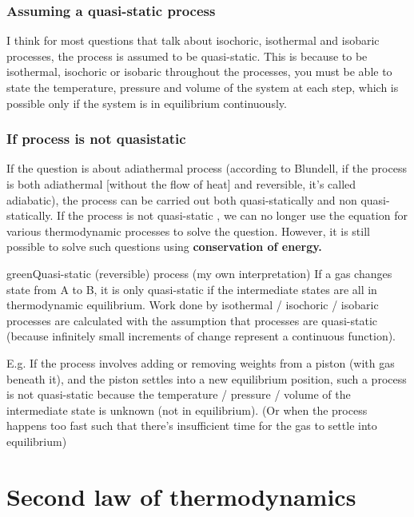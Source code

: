 \subsubsection{Assuming a quasi-static process}
I think for most questions that talk about isochoric, isothermal and isobaric processes, the process is assumed to be quasi-static. This is because to be isothermal, isochoric or isobaric throughout the processes, you must be able to state the temperature, pressure and volume of the system at each step, which is possible only if the system is in equilibrium continuously.

\subsubsection{If process is not quasistatic}

If the question is about adiathermal process (according to Blundell, if the process is both adiathermal [without the flow of heat] and reversible, it's called adiabatic), the process can be carried out both quasi-statically and non quasi-statically. If the process is not quasi-static , we can no longer use the equation for various thermodynamic processes to solve the question. However, it is still possible to solve such questions using \textbf{conservation of energy.}

\begin{mybox}{green}{Quasi-static (reversible) process (my own interpretation)}
    If a gas changes state from A to B, it is only quasi-static if the intermediate states are all in thermodynamic equilibrium. Work done by isothermal / isochoric / isobaric processes are calculated with the assumption that processes are quasi-static (because infinitely small increments of change represent a continuous function).

    \begin{flushleft}
        E.g. If the process involves adding or removing weights from a piston (with gas beneath it), and the piston settles into a new equilibrium position, such a process is not quasi-static because the temperature / pressure / volume of the intermediate state is unknown (not in equilibrium). (Or when the process happens too fast such that there's insufficient time for the gas to settle into equilibrium)
    \end{flushleft}

\end{mybox}

\section{Second law of thermodynamics}
